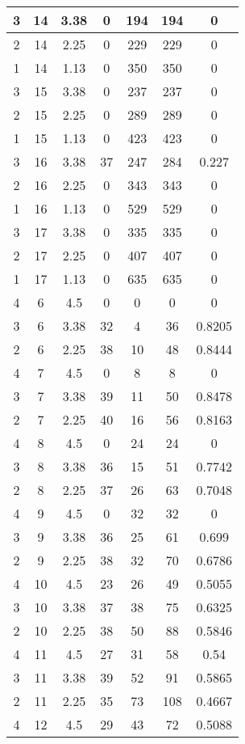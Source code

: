 \documentclass[letterpaper, 12pt]{article}
\begin{document}
\begin{longtable}{|c|c|c|c|c|c|c|}
\hline
3 & 14 & 3.38 & 0 & 194 & 194 & 0 \\
\hline
2 & 14 & 2.25 & 0 & 229 & 229 & 0 \\
\hline
1 & 14 & 1.13 & 0 & 350 & 350 & 0 \\
\hline
3 & 15 & 3.38 & 0 & 237 & 237 & 0 \\
\hline
2 & 15 & 2.25 & 0 & 289 & 289 & 0 \\
\hline
1 & 15 & 1.13 & 0 & 423 & 423 & 0 \\
\hline
3 & 16 & 3.38 & 37 & 247 & 284 & 0.227 \\
\hline
2 & 16 & 2.25 & 0 & 343 & 343 & 0 \\
\hline
1 & 16 & 1.13 & 0 & 529 & 529 & 0 \\
\hline
3 & 17 & 3.38 & 0 & 335 & 335 & 0 \\
\hline
2 & 17 & 2.25 & 0 & 407 & 407 & 0 \\
\hline
1 & 17 & 1.13 & 0 & 635 & 635 & 0 \\
\hline
4 & 6 & 4.5 & 0 & 0 & 0 & 0 \\
\hline
3 & 6 & 3.38 & 32 & 4 & 36 & 0.8205 \\
\hline
2 & 6 & 2.25 & 38 & 10 & 48 & 0.8444 \\
\hline
4 & 7 & 4.5 & 0 & 8 & 8 & 0 \\
\hline
3 & 7 & 3.38 & 39 & 11 & 50 & 0.8478 \\
\hline
2 & 7 & 2.25 & 40 & 16 & 56 & 0.8163 \\
\hline
4 & 8 & 4.5 & 0 & 24 & 24 & 0 \\
\hline
3 & 8 & 3.38 & 36 & 15 & 51 & 0.7742 \\
\hline
2 & 8 & 2.25 & 37 & 26 & 63 & 0.7048 \\
\hline
4 & 9 & 4.5 & 0 & 32 & 32 & 0 \\
\hline
3 & 9 & 3.38 & 36 & 25 & 61 & 0.699 \\
\hline
2 & 9 & 2.25 & 38 & 32 & 70 & 0.6786 \\
\hline
4 & 10 & 4.5 & 23 & 26 & 49 & 0.5055 \\
\hline
3 & 10 & 3.38 & 37 & 38 & 75 & 0.6325 \\
\hline
2 & 10 & 2.25 & 38 & 50 & 88 & 0.5846 \\
\hline
4 & 11 & 4.5 & 27 & 31 & 58 & 0.54 \\
\hline
3 & 11 & 3.38 & 39 & 52 & 91 & 0.5865 \\
\hline
2 & 11 & 2.25 & 35 & 73 & 108 & 0.4667 \\
\hline
4 & 12 & 4.5 & 29 & 43 & 72 & 0.5088 \\

\end{longtable}
\end{document}
